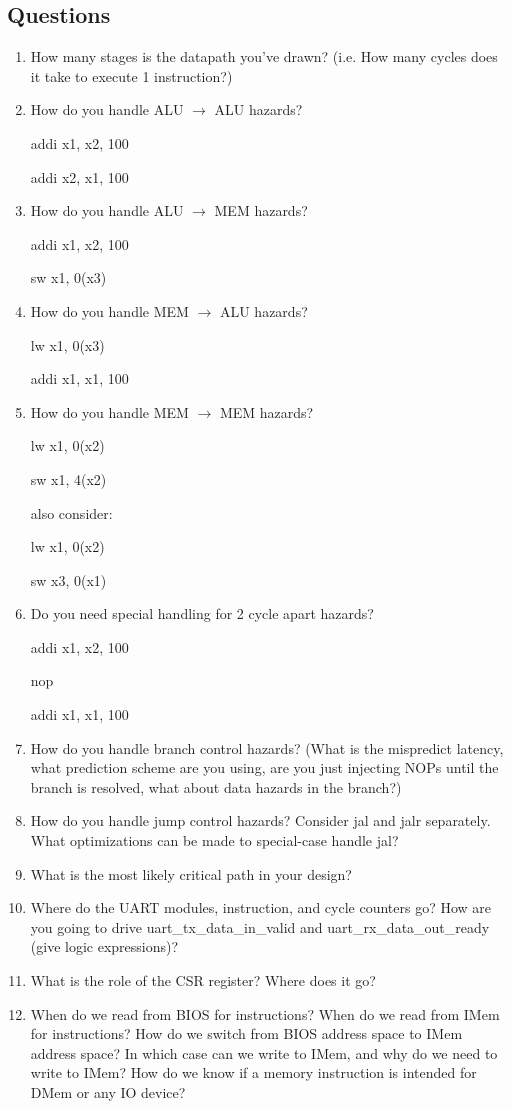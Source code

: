\documentclass[11pt]{article}
\begin{document}
\subsection{Questions}\label{sec:chkpt1_questions}
\begin{enumerate}
\item How many stages is the datapath you've drawn? (i.e. How many cycles does it take to execute 1 instruction?)
\item How do you handle ALU $\rightarrow$ ALU hazards?

addi x1, x2, 100

addi x2, x1, 100

\item How do you handle ALU $\rightarrow$ MEM hazards?

addi x1, x2, 100

sw x1, 0(x3)

\item How do you handle MEM $\rightarrow$ ALU hazards?

lw x1, 0(x3)

addi x1, x1, 100

\item How do you handle MEM $\rightarrow$ MEM hazards?

lw x1, 0(x2)

sw x1, 4(x2)

also consider:

lw x1, 0(x2)

sw x3, 0(x1)

\item Do you need special handling for 2 cycle apart hazards?

addi x1, x2, 100

 nop

 addi x1, x1, 100

\item How do you handle branch control hazards? (What is the mispredict latency, what prediction scheme are you using, are you just injecting NOPs until the branch is resolved, what about data hazards in the branch?)
\item How do you handle jump control hazards? Consider jal and jalr separately. What optimizations can be made to special-case handle jal? 
\item What is the most likely critical path in your design?
\item Where do the UART modules, instruction, and cycle counters go? How are you going to drive uart\_tx\_data\_in\_valid and uart\_rx\_data\_out\_ready (give logic expressions)?
\item What is the role of the CSR register? Where does it go?
\item When do we read from BIOS for instructions? When do we read from IMem for instructions? How do we switch from BIOS address space to IMem address space? In which case can we write to IMem, and why do we need to write to IMem? How do we know if a memory instruction is intended for DMem or any IO device?
\end{enumerate}
\end{document}
